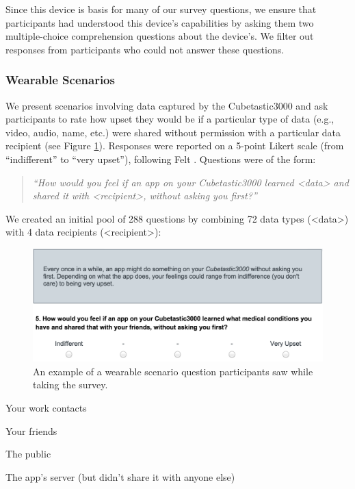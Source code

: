 Since this device is basis for many of our survey questions, we ensure that participants had understood this device's capabilities by asking them two multiple-choice comprehension questions about the device's. We filter out responses from participants who could not answer these questions.

\subsubsection{Wearable Scenarios}
We present scenarios involving data captured by the Cubetastic3000 and ask participants to rate how upset they would be if a particular type of data (e.g., video, audio, name, etc.) were shared without permission with a particular data recipient (see Figure \ref{fig:prompt}). Responses were reported on a 5-point Likert scale (from ``indifferent'' to ``very upset''), following Felt \etal\cite{Felt}. Questions were of the form: 

\begin{quotation}
\noindent
\textit{``How would you feel if an app on your Cubetastic3000 learned <data> and shared it with <recipient>, without asking you first?''}
\end{quotation}

We created an initial pool of 288 questions by combining 72 data types (<data>) with 4 data recipients (<recipient>): %

\begin{figure}[t]
	\centering
	\includegraphics[width=\columnwidth]{images/prompt.pdf}
	\caption{An example of a wearable scenario question participants saw while taking the survey.}
	\label{fig:prompt}
\end{figure}

\begin{packed_item}
\item Your work contacts
\item Your friends
\item The public
\item The app's server (but didn't share it with anyone else) %
\end{packed_item}


